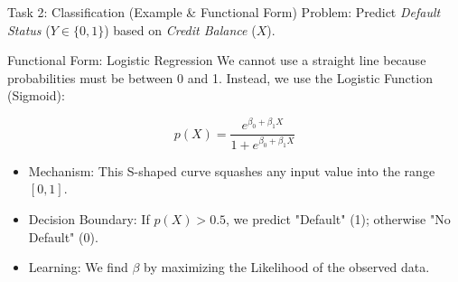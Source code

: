 \documentclass[aspectratio=169]{beamer}
\newcommand{\1}{\mathbf{1}}
\begin{document}
\begin{frame}{Task 2: Classification (Example \& Functional Form)}
    Problem: Predict \textit{Default Status} ($Y \in \{0, 1\}$) based on \textit{Credit Balance} ($X$).
    
    
    \vspace{1em}
    Functional Form: Logistic Regression
    We cannot use a straight line because probabilities must be between 0 and 1. Instead, we use the Logistic Function (Sigmoid):
    
    $$ p(X) = \frac{e^{\beta_0 + \beta_1 X}}{1 + e^{\beta_0 + \beta_1 X}} $$
    
    \begin{itemize}
        \item Mechanism: This S-shaped curve squashes any input value into the range $[0, 1]$.
        \item Decision Boundary: If $p(X) > 0.5$, we predict "Default" (1); otherwise "No Default" (0).
        \item Learning: We find $\beta$ by maximizing the Likelihood of the observed data.
    \end{itemize}
\end{frame}
\end{document}
